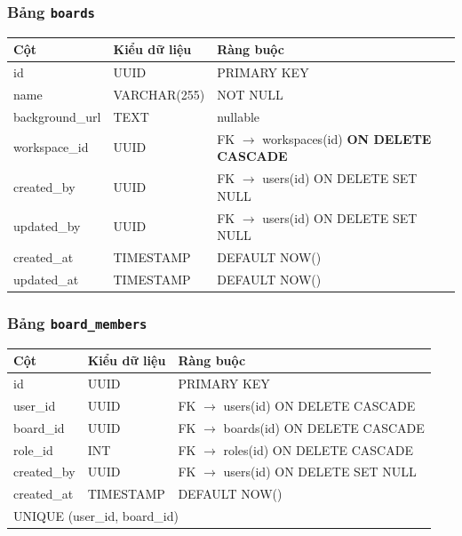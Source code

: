 \subsubsection*{Bảng \texttt{boards}}
\begin{table}[H]
\centering
\begin{tabularx}{\textwidth}{|l|l|X|}
\hline
\rowcolor{gray!20}
\textbf{Cột} & \textbf{Kiểu dữ liệu} & \textbf{Ràng buộc} \\
\hline
id & UUID & PRIMARY KEY \\
\hline
name & VARCHAR(255) & NOT NULL \\
\hline
background\_url & TEXT & nullable \\
\hline
workspace\_id & UUID & FK $\rightarrow$ workspaces(id) \textbf{ON DELETE CASCADE} \\
\hline
created\_by & UUID & FK $\rightarrow$ users(id) ON DELETE SET NULL \\
\hline
updated\_by & UUID & FK $\rightarrow$ users(id) ON DELETE SET NULL \\
\hline
created\_at & TIMESTAMP & DEFAULT NOW() \\
\hline
updated\_at & TIMESTAMP & DEFAULT NOW() \\
\hline
\end{tabularx}
\end{table}

\subsubsection*{Bảng \texttt{board\_members}}
\begin{table}[H]
\centering
\begin{tabularx}{\textwidth}{|l|l|X|}
\hline
\rowcolor{gray!20}
\textbf{Cột} & \textbf{Kiểu dữ liệu} & \textbf{Ràng buộc} \\
\hline
id & UUID & PRIMARY KEY \\
\hline
user\_id & UUID & FK $\rightarrow$ users(id) ON DELETE CASCADE \\
\hline
board\_id & UUID & FK $\rightarrow$ boards(id) ON DELETE CASCADE \\
\hline
role\_id & INT & FK $\rightarrow$ roles(id) ON DELETE CASCADE \\
\hline
created\_by & UUID & FK $\rightarrow$ users(id) ON DELETE SET NULL \\
\hline
created\_at & TIMESTAMP & DEFAULT NOW() \\
\hline
\multicolumn{3}{|l|}{UNIQUE (user\_id, board\_id)} \\
\hline
\end{tabularx}
\end{table}


